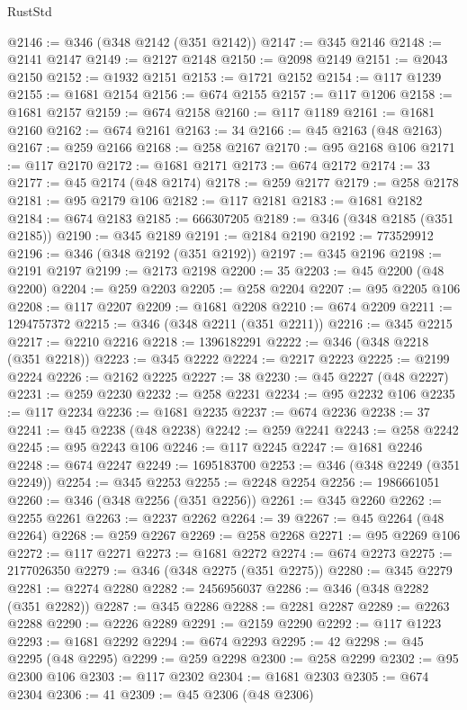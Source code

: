 \begin{lexlean}{RustStd}
\begin{coremodule}
{\begin{coremodule}
{{{{{{{{{{{{{{{{{{{{{{{{{{{{{{{{{{{{{{{@2146 := @346 (@348 @2142 (@351 @2142))
@2147 := @345 @2146
@2148 := @2141 @2147
@2149 := @2127 @2148
@2150 := @2098 @2149
@2151 := @2043 @2150
@2152 := @1932 @2151
@2153 := @1721 @2152
@2154 := @117 @1239
@2155 := @1681 @2154
@2156 := @674 @2155
@2157 := @117 @1206
@2158 := @1681 @2157
@2159 := @674 @2158
@2160 := @117 @1189
@2161 := @1681 @2160
@2162 := @674 @2161
@2163 := 34
@2166 := @45 @2163 (@48 @2163)
@2167 := @259 @2166
@2168 := @258 @2167
@2170 := @95 @2168 @106
@2171 := @117 @2170
@2172 := @1681 @2171
@2173 := @674 @2172
@2174 := 33
@2177 := @45 @2174 (@48 @2174)
@2178 := @259 @2177
@2179 := @258 @2178
@2181 := @95 @2179 @106
@2182 := @117 @2181
@2183 := @1681 @2182
@2184 := @674 @2183
@2185 := 666307205
@2189 := @346 (@348 @2185 (@351 @2185))
@2190 := @345 @2189
@2191 := @2184 @2190
@2192 := 773529912
@2196 := @346 (@348 @2192 (@351 @2192))
@2197 := @345 @2196
@2198 := @2191 @2197
@2199 := @2173 @2198
@2200 := 35
@2203 := @45 @2200 (@48 @2200)
@2204 := @259 @2203
@2205 := @258 @2204
@2207 := @95 @2205 @106
@2208 := @117 @2207
@2209 := @1681 @2208
@2210 := @674 @2209
@2211 := 1294757372
@2215 := @346 (@348 @2211 (@351 @2211))
@2216 := @345 @2215
@2217 := @2210 @2216
@2218 := 1396182291
@2222 := @346 (@348 @2218 (@351 @2218))
@2223 := @345 @2222
@2224 := @2217 @2223
@2225 := @2199 @2224
@2226 := @2162 @2225
@2227 := 38
@2230 := @45 @2227 (@48 @2227)
@2231 := @259 @2230
@2232 := @258 @2231
@2234 := @95 @2232 @106
@2235 := @117 @2234
@2236 := @1681 @2235
@2237 := @674 @2236
@2238 := 37
@2241 := @45 @2238 (@48 @2238)
@2242 := @259 @2241
@2243 := @258 @2242
@2245 := @95 @2243 @106
@2246 := @117 @2245
@2247 := @1681 @2246
@2248 := @674 @2247
@2249 := 1695183700
@2253 := @346 (@348 @2249 (@351 @2249))
@2254 := @345 @2253
@2255 := @2248 @2254
@2256 := 1986661051
@2260 := @346 (@348 @2256 (@351 @2256))
@2261 := @345 @2260
@2262 := @2255 @2261
@2263 := @2237 @2262
@2264 := 39
@2267 := @45 @2264 (@48 @2264)
@2268 := @259 @2267
@2269 := @258 @2268
@2271 := @95 @2269 @106
@2272 := @117 @2271
@2273 := @1681 @2272
@2274 := @674 @2273
@2275 := 2177026350
@2279 := @346 (@348 @2275 (@351 @2275))
@2280 := @345 @2279
@2281 := @2274 @2280
@2282 := 2456956037
@2286 := @346 (@348 @2282 (@351 @2282))
@2287 := @345 @2286
@2288 := @2281 @2287
@2289 := @2263 @2288
@2290 := @2226 @2289
@2291 := @2159 @2290
@2292 := @117 @1223
@2293 := @1681 @2292
@2294 := @674 @2293
@2295 := 42
@2298 := @45 @2295 (@48 @2295)
@2299 := @259 @2298
@2300 := @258 @2299
@2302 := @95 @2300 @106
@2303 := @117 @2302
@2304 := @1681 @2303
@2305 := @674 @2304
@2306 := 41
@2309 := @45 @2306 (@48 @2306)
}}}}}}}}}}}}}}}}}}}}}}}}}}}}}}}}}}}}}}}
\end{coremodule}}
\end{coremodule}
\end{lexlean}
